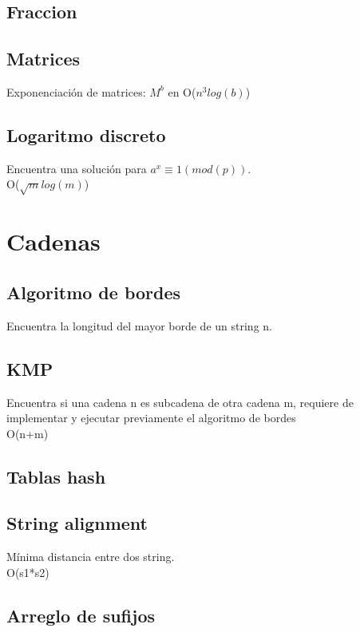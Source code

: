 \documentclass[10pt,landscape,twocolumn,a4paper,notitlepage]{article}
\newcommand\cppfile[2][]{

}
\begin{document}
			\subsection{Fraccion}
			\cppfile[9-47]{matematicas/fraccion.cpp}
			\subsection{Matrices}
			Exponenciación de matrices: $M^b$ en O($n^{3} log (b)$)
			\cppfile[8-36]{matematicas/matrices.cpp}
			\subsection{Logaritmo discreto}
			Encuentra una solución para $a^{x} \equiv 1 (mod(p))$.\\ O($\sqrt{m} log (m)$)
			\cppfile[7-25]{matematicas/logaritmo_discreto.cpp}
			
		\section{Cadenas}
			\subsection{Algoritmo de bordes}
			Encuentra la longitud del mayor borde de un string n.
			\cppfile[4-16]{cadenas/bordes.cpp}
			\subsection{KMP}
			Encuentra si una cadena n es subcadena de otra cadena m, requiere de implementar
			y ejecutar previamente el algoritmo de bordes\\
			O(n+m)
			\cppfile[18-29]{cadenas/kmp.cpp}
			\subsection{Tablas hash}
			\cppfile[7-19]{cadenas/Hashing.cpp}
			\subsection{String alignment}
			Mínima distancia entre dos string.\\O(s1*s2)
			\cppfile[8-25]{cadenas/string_distance.cpp}
			\subsection{Arreglo de sufijos}
			\cppfile[7-48]{cadenas/Arreglo_de_sufijos.cpp}
\end{document}
